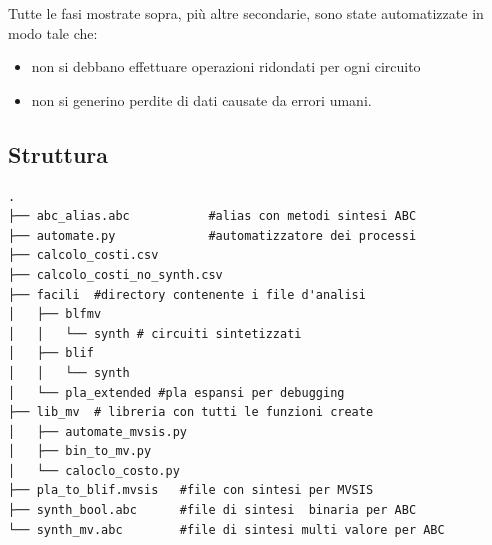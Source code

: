 \documentclass[
  italian,
]{book}
\providecommand{\tightlist}{%
  \setlength{\itemsep}{0pt}\setlength{\parskip}{0pt}}
\begin{document}
Tutte le fasi mostrate sopra, più altre secondarie, sono state automatizzate in modo tale che:

\begin{itemize}
\tightlist
\item
  non si debbano effettuare operazioni ridondati per ogni circuito
\item
  non si generino perdite di dati causate da errori umani.
\end{itemize}

\hypertarget{struttura}{%
\subsection{Struttura}\label{struttura}}

\begin{verbatim}
.
├── abc_alias.abc           #alias con metodi sintesi ABC
├── automate.py             #automatizzatore dei processi
├── calcolo_costi.csv
├── calcolo_costi_no_synth.csv
├── facili  #directory contenente i file d'analisi
│   ├── blfmv
│   │   └── synth # circuiti sintetizzati
│   ├── blif
│   │   └── synth
│   └── pla_extended #pla espansi per debugging
├── lib_mv  # libreria con tutti le funzioni create
│   ├── automate_mvsis.py
│   ├── bin_to_mv.py
│   └── caloclo_costo.py
├── pla_to_blif.mvsis   #file con sintesi per MVSIS
├── synth_bool.abc      #file di sintesi  binaria per ABC
└── synth_mv.abc        #file di sintesi multi valore per ABC
\end{verbatim}

\newpage
\end{document}
